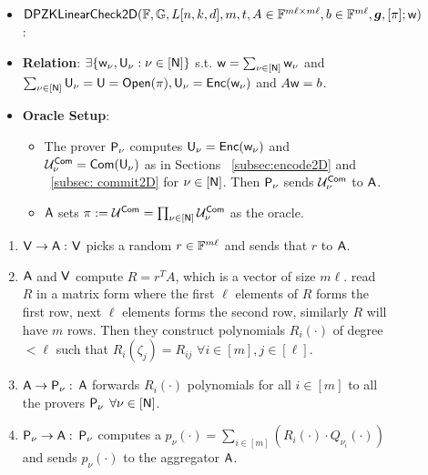 \begin{figure}[h!]
\centering
\begin{framed}
	\begin{itemize}
		\item {$\mathsf{DPZK} \mathsf{LinearCheck2D} (\mathbb{F}, \mathbb{G}, L[n,k,d], m, t, A \in \mathbb{F}^{m\ell \times m\ell}, b\in \mathbb{F}^{m\ell}, \bm{g}, [\pi]; \mathsf{w})$}:
		\item {\bf Relation}: $\exists \{\mathsf{w}_{\nu}, \mathsf{U}_{\nu} : \nu\in [\mathsf{N}]\}$ s.t. $\mathsf{w} = \sum_{\nu \in [\mathsf{N}]} \mathsf{w}_{\nu}$ and $\sum_{\nu \in [\mathsf{N}]} \mathsf{U}_{\nu}= \mathsf{U} = \mathsf{Open}(\pi), \mathsf{U}_{\nu} = \mathsf{Enc}(\mathsf{w}_{\nu})$ and $A\mathsf{w} = b$. 
		\item {\bf Oracle Setup}: 
		\begin{itemize}
			\item The prover $\mathsf{P}_{\nu}$ computes $\mathsf{U}_{\nu} = \mathsf{Enc}(\mathsf{w}_{\nu})$ and $\mathcal{U}^{\mathsf{Com}}_{\nu} = \mathsf{Com}(\mathsf{U}_{\nu})$ as in Sections ~\ref{subsec:encode2D} and ~\ref{subsec: commit2D} for $\nu \in [\mathsf{N}]$. Then $\mathsf{P}_{\nu}$ sends $\mathcal{U}^{\mathsf{Com}}_{\nu}$ to $\mathsf{A}$.
			\item $\mathsf{A}$ sets $\pi := \mathcal{U}^{\mathsf{Com}} = \prod_{\nu \in [\mathsf{N}]} \mathcal{U}^{\mathsf{Com}}_{\nu}$ as the oracle.
		\end{itemize}
	\end{itemize}
\begin{enumerate}
	\item $\mathsf{V} \rightarrow \mathsf{A} : $ $\mathsf{V}$ picks a random $r\in \mathbb{F}^{m\ell}$ and sends that $r$ to $\mathsf{A}$.
	
	\item $\mathsf{A}$ and $\mathsf{V}$ compute $R=r^TA$, which is a vector of size $m\ell$. read $R$ in a matrix form where the first $\ell$ elements of $R$ forms the first row, next $\ell$ elements forms the second row, similarly $R$ will have $m$ rows. Then they construct polynomials $R_i(\cdot)$ of degree $<\ell$ such that $R_i(\zeta_j)=R_{ij}$ $\forall i\in[m], j\in[\ell]$.
	
	\item $\mathsf{A} \rightarrow \mathsf{P}_{\nu} : $ $\mathsf{A}$ forwards $R_i(\cdot)$ polynomials for all $i\in[m]$ to all the provers $\mathsf{P}_{\nu}$ $\forall \nu\in[\mathsf{N}]$.
	
	\item $\mathsf{P}_{\nu} \rightarrow \mathsf{A} : $ $\mathsf{P}_{\nu}$ computes a $p_{\nu}(\cdot) = \sum_{i\in[m]} (R_i(\cdot)\cdot Q_{{\nu}_i}(\cdot))$ and sends $p_{\nu}(\cdot)$ to the aggregator $\mathsf{A}$.
	

\end{enumerate}
\end{framed}
\end{figure}
